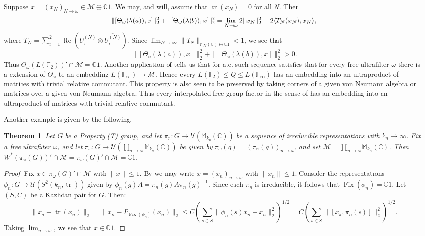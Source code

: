 \documentclass[10pt]{amsart}
\newtheorem{thm}{Theorem}[section]
\theoremstyle{definition}
\numberwithin{equation}{section}
\newcommand{\bC}{{\mathbb C}}
\newcommand{\bF}{{\mathbb F}}
\newcommand{\bM}{{\mathbb M}}
\newcommand{\cM}{{\mathcal M}}
\newcommand{\cU}{{\mathcal U}}
\renewcommand{\Re}{\operatorname{Re}}
\DeclareMathOperator{\tr}{tr}
\DeclareMathOperator{\Fix}{Fix}
\DeclarePairedDelimiter{\ip}{\langle}{\rangle}
\begin{document}
Suppose $x=(x_{N})_{N\to\omega}\in \cM\ominus\bC 1.$ We may, and will, assume that $\tr(x_{N})=0$ for all $N$. Then
\[\|[\Theta_{\omega}(\lambda(a)),x]\|_{2}^{2}+\|[\Theta_{\omega}(\lambda(b)),x]\|_{2}^{2}=\lim_{N\to\omega}2\|x_{N}\|_{2}^{2}-2\ip{T_{N}(x_{N}),x_{N}},\]
where $T_{N}=\sum_{i=1}^{2}\Re(U_{i}^{(N)}\otimes \overline{U_{i}^{(N)}}).$ Since $\lim_{N\to\infty}\|T_{N}\|_{\bM_{N}(\bC)\ominus\bC 1}<1$, we see that \[\|[\Theta_{\omega}(\lambda(a)),x]\|_{2}^{2}+\|[\Theta_{\omega}(\lambda(b)),x]\|_{2}^{2}>0.\]
Thus $\Theta_{\omega}(L(\bF_{2}))'\cap \cM=\bC 1$. 
Another application of \cite[Theorem 3.8]{VoicAsyFree} tells us that for a.e. such sequence satisfies that for every free ultrafilter $\omega$ there is a extension of $\Theta_{\omega}$ to an embedding $L(\bF_{\infty})\to \cM$. Hence every $L(\bF_{2})\leq Q\leq L(\bF_{\infty})$ has an embedding into an ultraproduct of matrices with trivial relative commutant. This property is also seen to be preserved by taking corners of a given von Neumann algebra or matrices over a given von Neumann algebra. Thus every interpolated free group factor in the sense of \cite{DykmaIFGF, RadulescuIFGF} has an embedding into an ultraproduct of matrices with trivial relative commutant. 


Another example is given by the following. 
\begin{thm}\label{thm: Property T trivial rel comm}
Let $G$ be a Property (T) group, and let $\pi_{n}\colon G\to \cU(\bM_{k_{n}}(\bC))$ be a sequence of irreducible representations with $k_{n}\to\infty$. Fix a free ultrafilter $\omega$, and let $\pi_{\omega}\colon G\to \cU\left(\prod_{n\to\omega}\bM_{k_{n}}(\bC)\right)$ be given by $\pi_{\omega}(g)=(\pi_{n}(g))_{n\to\omega}$, and set $\cM=\prod_{n\to\omega}\bM_{k_{n}}(\bC)$. Then $W^{*}(\pi_{\omega}(G))'\cap \cM=\pi_{\omega}(G)'\cap \cM=\bC 1$.   
\end{thm}


\begin{proof}
Fix $x\in \pi_{\omega}(G)'\cap \cM$ with $\|x\|\leq 1$. By \cite[Proposition II.5.1.5]{BlackadarOA} we may write $x=(x_{n})_{n\to\omega}$ with $\|x_{n}\|\leq 1$. Consider the representations $\phi_{n}\colon G\to \cU(S^{2}(k_{n},\tr))$ given by $\phi_{n}(g)A=\pi_{n}(g)A\pi_{n}(g)^{-1}$. Since each $\pi_{n}$ is irreducible, it follows that 
$\Fix(\phi_{n})=\bC1$. Let $(S,C)$ be a Kazhdan pair for $G$. Then:
\[\|x_{n}-\tr(x_{n})\|_{2}=\|x_{n}-P_{\Fix(\phi_{n})}(x_{n})\|_{2}\leq C\left(\sum_{s\in S}\|\phi_{n}(s)x_{n}-x_{n}\|_{2}^{2}\right)^{1/2}=C\left(\sum_{s\in S}\|[x_{n},\pi_{n}(s)]\|_{2}^{2}\right)^{1/2}.\]
Taking $\lim_{n\to\omega}$, we see that $x\in \bC 1$. 


\end{proof}
\end{document}
